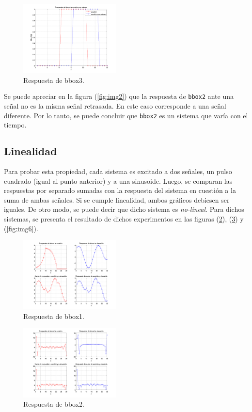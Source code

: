 \documentclass[10pt,conference,a4paper]{IEEEtran}
\begin{document}
\begin{figure}[H]
  \centering
  \includegraphics[width=0.45\textwidth]{../img/img3.png}
  \caption{Respuesta de bbox3.}
  \label{fig:img3}
\end{figure}

Se puede apreciar en la figura (\ref{fig:img2}) que la respuesta de \verb|bbox2|
ante una se\~nal no es la misma se\~nal retrasada. En este caso corresponde a 
una se\~nal diferente. Por lo tanto, se puede concluir que \verb|bbox2| es un 
sistema que var\'ia con el tiempo.

\subsection{Linealidad}

Para probar esta propiedad, cada sistema es excitado a dos se\~nales, un pulso 
cuadrado (igual al punto anterior) y a una sinusoide. Luego, se comparan las 
respuestas por separado sumadas con la respuesta del sistema en cuesti\'on a la 
suma de ambas se\~nales. Si se cumple linealidad, ambos gr\'aficos debiesen ser 
iguales. De otro modo, se puede decir que dicho sistema es \emph{no-lineal}.
Para dichos sistemas, se presenta el resultado de dichos experimentos en las 
figuras (\ref{fig:img4}), (\ref{fig:img5}) y (\ref{fig:img6}).

\begin{figure}[H]
  \centering
  \includegraphics[width=0.45\textwidth]{../img/img4.png}
  \caption{Respuesta de bbox1.}
  \label{fig:img4}
\end{figure}

\begin{figure}[H]
  \centering
  \includegraphics[width=0.45\textwidth]{../img/img5.png}
  \caption{Respuesta de bbox2.}
  \label{fig:img5}
\end{figure}
\end{document}
